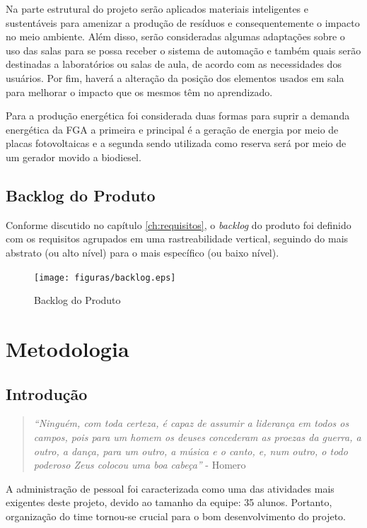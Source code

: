 Na parte estrutural do projeto serão aplicados materiais inteligentes e sustentáveis para amenizar a produção de resíduos e consequentemente o impacto no meio ambiente. Além disso, serão consideradas algumas adaptações sobre o uso das salas para se possa receber o sistema de automação e também quais serão destinadas a laboratórios ou salas de aula, de acordo com as necessidades dos usuários. Por fim, haverá a alteração da posição dos elementos usados em sala para melhorar o impacto que os mesmos têm no aprendizado.

Para a produção energética foi considerada duas formas para suprir a demanda energética da FGA a primeira e principal é a geração de energia por meio de placas fotovoltaicas e a segunda sendo utilizada como reserva será por meio de um gerador movido a biodiesel.

\section{Backlog do Produto}
Conforme discutido no capítulo \ref{ch:requisitos}, o \textit{backlog} do produto foi definido com os requisitos agrupados em uma rastreabilidade vertical, seguindo do mais abstrato (ou alto nível) para o mais específico (ou baixo nível).

\begin{figure}[!h]
  \centering
  	\texttt{[image: figuras/backlog.eps]}
   \caption{Backlog do Produto\label{fig:backlog}}

\end{figure}

\chapter{Metodologia}
\section{Introdução}
\begin{quote}
\textit{“Ninguém, com toda certeza, é capaz de assumir a liderança em todos os campos, pois para um homem os deuses concederam as proezas da guerra, a outro, a dança, para um outro, a música e o canto, e, num outro, o todo poderoso Zeus colocou uma boa cabeça”} - Homero
\end{quote}

\vspace{\onelineskip}
\vspace{\onelineskip}

A administração de pessoal foi caracterizada como uma das atividades mais exigentes deste projeto, devido ao tamanho da equipe: 35 alunos. Portanto, organização do time tornou-se crucial para o bom desenvolvimento do projeto.

